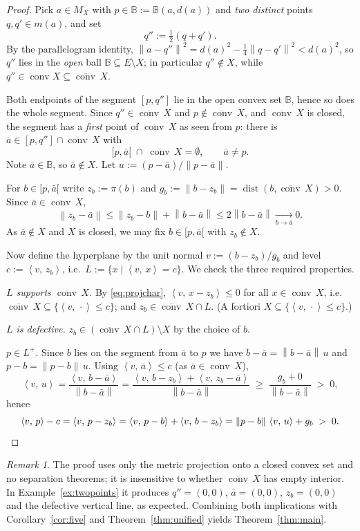 \documentclass[11pt]{article}
\theoremstyle{remark}
\newtheorem{remark}[theorem]{Remark}
\newcommand{\B}{\mathbb{B}}
\newcommand{\X}{X}
\newcommand{\conv}{\operatorname{conv}}
\newcommand{\cconv}[1]{\overline{\conv}\,#1}
\newcommand{\dist}{\operatorname{dist}}
\newcommand{\sca}[2]{\left\langle #1,\, #2\right\rangle}
\newcommand{\norm}[1]{\left\lVert #1\right\rVert}
\newcommand{\Mx}{M_{\X}}
\begin{document}
\begin{proof}
Pick $a\in\Mx$ with $p\in\B:=\B(a,d(a))$ and \emph{two distinct} points $q,q'\in m(a)$, and set
\[
 q'':=\tfrac12(q+q') .
\]
By the parallelogram identity,
$\norm{a-q''}^2=d(a)^2-\tfrac14\norm{q-q'}^2<d(a)^2$, so $q''$ lies in the \emph{open} ball
$\B\subseteq E\setminus \X$; in particular $q''\notin \X$, while
$q''\in\conv\X\subseteq\cconv\X$.

Both endpoints of the segment $[p,q'']$ lie in the open convex set $\B$, hence so does the whole
segment. Since $q''\in\cconv \X$ and $p\notin\cconv\X$, and $\cconv\X$ is closed, the segment
has a \emph{first} point of $\cconv\X$ as seen from $p$: there is
$\bar a\in[p,q'']\cap\cconv \X$ with
\[
 [p,\bar a[\;\cap\;\cconv \X=\emptyset,\qquad \bar a\neq p .
\]
Note $\bar a\in\B$, so $\bar a\notin \X$. Let $u:=(p-\bar a)/\norm{p-\bar a}$.

For $b\in[p,\bar a[$ write $z_b:=\pi(b)$ and $g_b:=\norm{b-z_b}=\dist(b,\cconv\X)>0$. Since
$\bar a\in\cconv \X$,
\[
 \norm{z_b-\bar a}\le\norm{z_b-b}+\norm{b-\bar a}\le 2\norm{b-\bar a}\xrightarrow[b\to\bar a]{}0 .
\]
As $\bar a\notin \X$ and $\X$ is closed, we may fix $b\in[p,\bar a[$ with $z_b\notin \X$.

Now define the hyperplane by the unit normal $v:=(b-z_b)/g_b$ and level $c:=\sca{v}{z_b}$, i.e.\
$L:=\{x\mid \sca{v}{x}=c\}$. We check the three required properties.

\emph{$L$ supports $\cconv \X$.} By \eqref{eq:projchar}, $\sca{v}{x-z_b}\le0$ for all
$x\in\cconv \X$, i.e.\ $\cconv\X\subseteq\{\sca{v}{\cdot}\le c\}$; and $z_b\in\cconv\X\cap L$.
(A fortiori $\X\subseteq\{\sca{v}{\cdot}\le c\}$.)

\emph{$L$ is defective.} $z_b\in(\cconv \X\cap L)\setminus \X$ by the choice of $b$.

\emph{$p\in L^{+}$.} Since $b$ lies on the segment from $\bar a$ to $p$ we have
$b-\bar a=\norm{b-\bar a}\,u$ and $p-b=\norm{p-b}\,u$. Using $\sca{v}{\bar a}\le c$
(as $\bar a\in\cconv\X$),
\[
 \sca{v}{u}=\frac{\sca{v}{b-\bar a}}{\norm{b-\bar a}}
 =\frac{\sca{v}{b-z_b}+\sca{v}{z_b-\bar a}}{\norm{b-\bar a}}
 \;\ge\;\frac{g_b+0}{\norm{b-\bar a}}\;>\;0 ,
\]
hence
\[
 \sca{v}{p}-c=\sca{v}{p-z_b}=\sca{v}{p-b}+\sca{v}{b-z_b}
 =\norm{p-b}\,\sca{v}{u}+g_b\;>\;0 . \qedhere
\]
\end{proof}

\begin{remark}
The proof uses only the metric projection onto a closed convex set and no separation theorems;
it is insensitive to whether $\cconv\X$ has empty interior. In Example~\ref{ex:twopoints} it
produces $q''=(0,0)$, $\bar a=(0,0)$, $z_b=(0,0)$ and the defective vertical line, as expected.
Combining both implications with Corollary~\ref{cor:five} and Theorem~\ref{thm:unified} yields
Theorem~\ref{thm:main}.
\end{remark}
\end{document}
